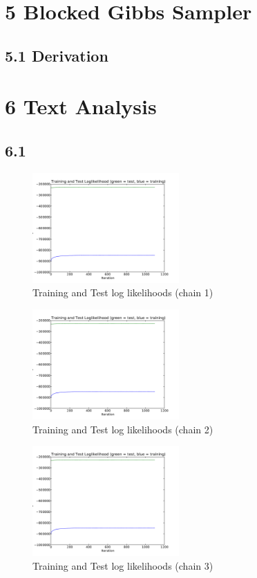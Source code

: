 \documentclass{article}
\begin{document}
\section*{5 Blocked Gibbs Sampler}
\subsection*{5.1 Derivation}

\section*{6 Text Analysis}
\subsection*{6.1}

\begin{figure}[H]
  \caption{Training and Test log likelihoods (chain 1)}
  \centering
    \includegraphics[width=0.5\textwidth]{q6_p1_1.pdf}
\end{figure}

\begin{figure}[H]
  \caption{Training and Test log likelihoods (chain 2)}
  \centering
    \includegraphics[width=0.5\textwidth]{q6_p1_2.pdf}
\end{figure}

\begin{figure}[H]
  \caption{Training and Test log likelihoods (chain 3)}
  \centering
    \includegraphics[width=0.5\textwidth]{q6_p1_2.pdf}
\end{figure}
\end{document}
